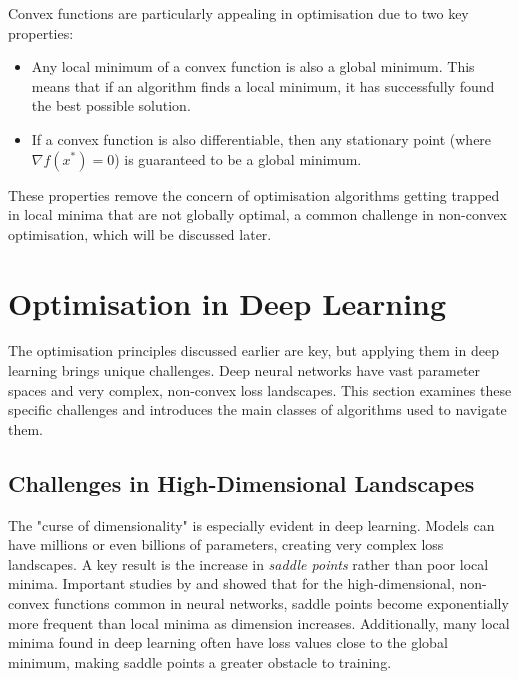 Convex functions are particularly appealing in optimisation due to two key properties:
\begin{itemize}
    \item Any local minimum of a convex function is also a global minimum. This means that if an algorithm finds a local minimum, it has successfully found the best possible solution.
    \item If a convex function is also differentiable, then any stationary point (where $\nabla f(x^*) = 0$) is guaranteed to be a global minimum.
\end{itemize}
These properties remove the concern of optimisation algorithms getting trapped in local minima that are not globally optimal, a common challenge in non-convex optimisation, which will be discussed later.

\section{Optimisation in Deep Learning}
\label{sec:optimisation_in_deep_learning}

The optimisation principles discussed earlier are key, but applying them in deep learning brings unique challenges. Deep neural networks have vast parameter spaces and very complex, non-convex loss landscapes. This section examines these specific challenges and introduces the main classes of algorithms used to navigate them.

\subsection{Challenges in High-Dimensional Landscapes}
\label{ssec:dl_challenges}

The "curse of dimensionality" is especially evident in deep learning. Models can have millions or even billions of parameters, creating very complex loss landscapes. A key result is the increase in \textit{saddle points} rather than poor local minima. Important studies by \citet{dauphin2014sfn} and \citet{choromanska2015loss} showed that for the high-dimensional, non-convex functions common in neural networks, saddle points become exponentially more frequent than local minima as dimension increases. Additionally, many local minima found in deep learning often have loss values close to the global minimum, making saddle points a greater obstacle to training.

